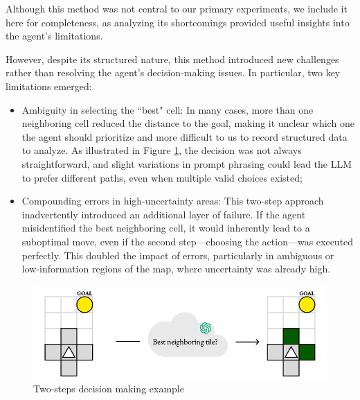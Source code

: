 Although this method was not central to our primary experiments, we include it here
for completeness, as analyzing its shortcomings provided useful insights into
the agent's limitations.

However, despite its structured nature, this method introduced new challenges
rather than resolving the agent's decision-making issues. In particular, two key
limitations emerged:
\begin{itemize}
  \item Ambiguity in selecting the ``best" cell: In many cases, more than one
    neighboring cell reduced the distance to the goal, making it unclear which one
    the agent should prioritize and more difficult to us to record structured data
    to analyze. As illustrated in Figure \ref{fig:extra2}, the decision was not always
    straightforward, and slight variations in prompt phrasing could lead the LLM
    to prefer different paths, even when multiple valid choices existed;

  \item Compounding errors in high-uncertainty areas: This two-step approach
    inadvertently introduced an additional layer of failure. If the agent misidentified
    the best neighboring cell, it would inherently lead to a suboptimal move, even
    if the second step—choosing the action—was executed perfectly. This doubled
    the impact of errors, particularly in ambiguous or low-information regions of
    the map, where uncertainty was already high.
\end{itemize}

\vspace{7mm}
\begin{figure}[h!]
  \centering
  \includegraphics[width=.66\textwidth]{images/results_discussion/extra2.pdf}
  \caption{Two-steps decision making example}
  \label{fig:extra2}
\end{figure}
\vspace{7mm}